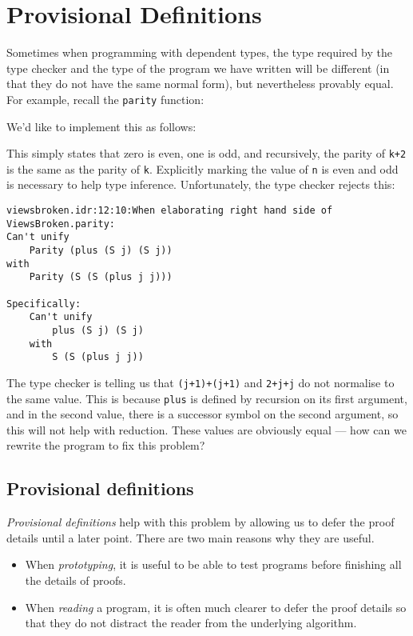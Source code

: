 \section{Provisional Definitions}
\label{sect:provisional}

Sometimes when programming with dependent types, the type required by the type checker and the type of the program we have written will be different (in that they do not have the same normal form), but nevertheless provably equal.
For example, recall the \texttt{parity} function:


\noindent
We'd like to implement this as follows:


\noindent
This simply states that zero is even, one is odd, and recursively, the parity of \texttt{k+2} is the same as the parity of \texttt{k}. 
Explicitly marking the value of \texttt{n} is even and odd is necessary to help type inference.
Unfortunately, the type checker rejects this:

\begin{lstlisting}[style=stdout]
viewsbroken.idr:12:10:When elaborating right hand side of ViewsBroken.parity:
Can't unify
	Parity (plus (S j) (S j))
with
	Parity (S (S (plus j j)))

Specifically:
	Can't unify
		plus (S j) (S j)
	with
		S (S (plus j j))
\end{lstlisting}

\noindent
The type checker is telling us that \texttt{(j+1)+(j+1)} and \texttt{2+j+j} do not normalise to the same value.
This is because \texttt{plus} is defined by recursion on its first argument, and in the second value, there is a successor symbol on the second argument, so this will not help with reduction.
These values are obviously equal --- how can we rewrite the program to fix this problem?

\subsection{Provisional definitions}

\emph{Provisional definitions} help with this problem by allowing us to defer the proof details until a later point.
There are two main reasons why they are useful.

\begin{itemize}
\item When \emph{prototyping}, it is useful to be able to test programs before finishing all the details of proofs.  
\item When \emph{reading} a program, it is often much clearer to defer the proof details so that they do not distract the reader from the underlying algorithm.
\end{itemize}

